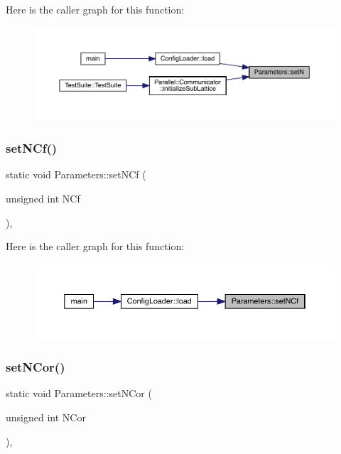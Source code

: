 Here is the caller graph for this function\+:\nopagebreak
\begin{figure}[H]
\begin{center}
\leavevmode
\includegraphics[width=350pt]{class_parameters_a0e0118ebbe8f19148a5c6d737c7a2c85_icgraph}
\end{center}
\end{figure}
\mbox{\label{class_parameters_a3c35caa5de4bb545a2b48af07e1756f3}} 
\subsubsection{\texorpdfstring{setNCf()}{setNCf()}}
{\footnotesize\ttfamily static void Parameters\+::set\+N\+Cf (\begin{DoxyParamCaption}\item[{unsigned int}]{N\+Cf }\end{DoxyParamCaption})\hspace{0.3cm}{\ttfamily [inline]}, {\ttfamily [static]}}

Here is the caller graph for this function\+:\nopagebreak
\begin{figure}[H]
\begin{center}
\leavevmode
\includegraphics[width=350pt]{class_parameters_a3c35caa5de4bb545a2b48af07e1756f3_icgraph}
\end{center}
\end{figure}
\mbox{\label{class_parameters_afb3ef2dca9d24511a1904bc313fd8513}} 
\subsubsection{\texorpdfstring{setNCor()}{setNCor()}}
{\footnotesize\ttfamily static void Parameters\+::set\+N\+Cor (\begin{DoxyParamCaption}\item[{unsigned int}]{N\+Cor }\end{DoxyParamCaption})\hspace{0.3cm}{\ttfamily [inline]}, {\ttfamily [static]}}

